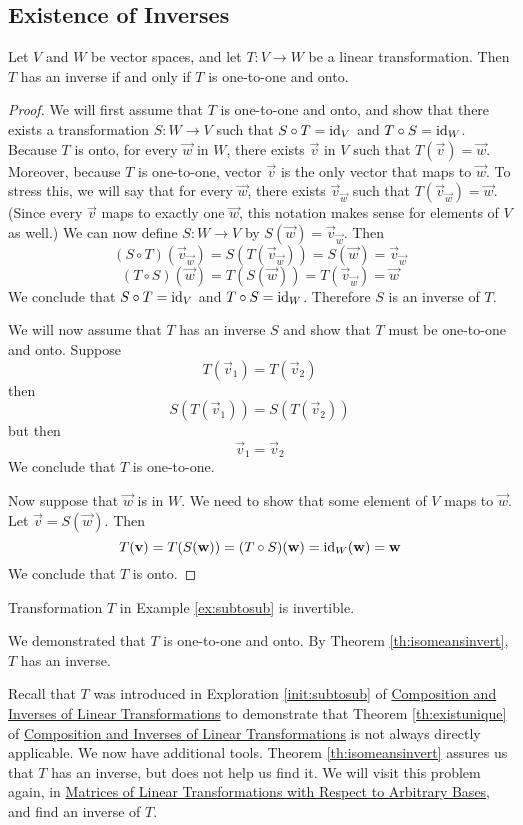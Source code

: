 \documentclass{ximera}
\begin{document}
\subsection*{Existence of Inverses}
\begin{theorem}\label{th:isomeansinvert} Let $V$ and $W$ be vector spaces, and let $T:V\rightarrow W$ be a linear transformation.  Then $T$ has an inverse if and only if $T$ is one-to-one and onto. 
\end{theorem}
\begin{proof}
We will first assume that $T$ is one-to-one and onto, and show that there exists a transformation $S:W\rightarrow V$ such that $S\circ T=\text{id}_V$ and $T\circ S=\text{id}_W$.  Because $T$ is onto, for every $\vec{w}$ in $W$, there exists $\vec{v}$ in $V$ such that $T(\vec{v})=\vec{w}$.  Moreover, because $T$ is one-to-one, vector $\vec{v}$ is the only vector that maps to $\vec{w}$.  To stress this, we will say that for every $\vec{w}$, there exists $\vec{v}_{\vec{w}}$ such that $T(\vec{v}_{\vec{w}})=\vec{w}$. (Since every $\vec{v}$ maps to exactly one $\vec{w}$, this notation makes sense for elements of $V$ as well.)  We can now define $S:W\rightarrow V$ by $S(\vec{w})=\vec{v}_{\vec{w}}$.
Then
$$(S\circ T)(\vec{v}_{\vec{w}})=S(T(\vec{v}_{\vec{w}}))=S(\vec{w})=\vec{v}_{\vec{w}}$$
$$(T\circ S)(\vec{w})=T(S(\vec{w}))=T(\vec{v}_{\vec{w}})=\vec{w}$$
We conclude that $S\circ T=\text{id}_V$ and $T\circ S=\text{id}_W$.  Therefore $S$ is an inverse of $T$.

We will now assume that $T$ has an inverse $S$ and show that $T$ must be one-to-one and onto.  
Suppose $$T(\vec{v}_1)=T(\vec{v}_2)$$ then $$S(T(\vec{v}_1))=S(T(\vec{v}_2))$$
but then
$$\vec{v}_1=\vec{v}_2$$
We conclude that $T$ is one-to-one.

Now suppose that $\vec{w}$ is in $W$.  We need to show that some element of $V$ maps to $\vec{w}$.  Let $\vec{v}=S(\vec{w})$.  Then
$$T(\mathbf{v})=T(S(\mathbf{w}))=(T\circ S)(\mathbf{w})=\text{id}_W(\mathbf{w})=\mathbf{w}$$
We conclude that $T$ is onto.
\end{proof}

\begin{example}\label{ex:subtosubinvert}
Transformation $T$ in Example \ref{ex:subtosub}  is invertible.
\begin{explanation}
We demonstrated that $T$ is one-to-one and onto.  By Theorem \ref{th:isomeansinvert}, $T$ has an inverse.  

Recall that $T$ was introduced in Exploration \ref {init:subtosub} of \href{https://ximera.osu.edu/oerlinalg/LinearAlgebra/LTR-0030/main}{Composition and Inverses of Linear Transformations} to demonstrate that Theorem \ref{th:existunique} of \href{https://ximera.osu.edu/oerlinalg/LinearAlgebra/LTR-0030/main}{Composition and Inverses of Linear Transformations} is not always directly applicable.  We now have additional tools. Theorem \ref{th:isomeansinvert} assures us that $T$ has an inverse, but does not help us find it. We will visit this problem again, in \href{https://ximera.osu.edu/oerlinalg/LinearAlgebra/LTR-0080/main}{Matrices of Linear Transformations with Respect to Arbitrary Bases}, and find an inverse of $T$.
\end{explanation}
\end{example}
\end{document}
